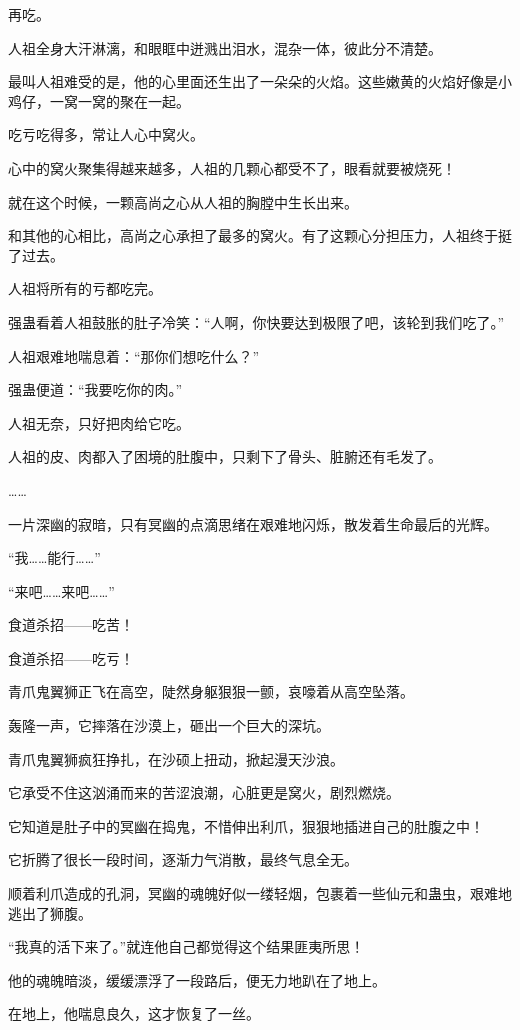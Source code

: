 \begin{this_body}
再吃。

人祖全身大汗淋漓，和眼眶中迸溅出泪水，混杂一体，彼此分不清楚。

最叫人祖难受的是，他的心里面还生出了一朵朵的火焰。这些嫩黄的火焰好像是小鸡仔，一窝一窝的聚在一起。

吃亏吃得多，常让人心中窝火。

心中的窝火聚集得越来越多，人祖的几颗心都受不了，眼看就要被烧死！

就在这个时候，一颗高尚之心从人祖的胸膛中生长出来。

和其他的心相比，高尚之心承担了最多的窝火。有了这颗心分担压力，人祖终于挺了过去。

人祖将所有的亏都吃完。

强蛊看着人祖鼓胀的肚子冷笑：“人啊，你快要达到极限了吧，该轮到我们吃了。”

人祖艰难地喘息着：“那你们想吃什么？”

强蛊便道：“我要吃你的肉。”

人祖无奈，只好把肉给它吃。

人祖的皮、肉都入了困境的肚腹中，只剩下了骨头、脏腑还有毛发了。

……

一片深幽的寂暗，只有冥幽的点滴思绪在艰难地闪烁，散发着生命最后的光辉。

“我……能行……”

“来吧……来吧……”

食道杀招——吃苦！

食道杀招——吃亏！

青爪鬼翼狮正飞在高空，陡然身躯狠狠一颤，哀嚎着从高空坠落。

轰隆一声，它摔落在沙漠上，砸出一个巨大的深坑。

青爪鬼翼狮疯狂挣扎，在沙硕上扭动，掀起漫天沙浪。

它承受不住这汹涌而来的苦涩浪潮，心脏更是窝火，剧烈燃烧。

它知道是肚子中的冥幽在捣鬼，不惜伸出利爪，狠狠地插进自己的肚腹之中！

它折腾了很长一段时间，逐渐力气消散，最终气息全无。

顺着利爪造成的孔洞，冥幽的魂魄好似一缕轻烟，包裹着一些仙元和蛊虫，艰难地逃出了狮腹。

“我真的活下来了。”就连他自己都觉得这个结果匪夷所思！

他的魂魄暗淡，缓缓漂浮了一段路后，便无力地趴在了地上。

在地上，他喘息良久，这才恢复了一丝。


\end{this_body}
